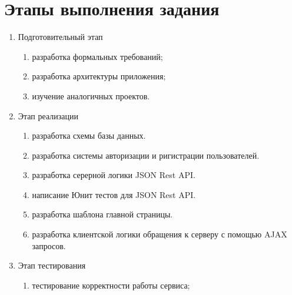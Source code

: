 \section{Этапы выполнения задания}
\label{sec:practice:task_steps}

\begin{enumerate}
  \item Подготовительный этап
  \begin{enumerate}
    \item разработка формальных требований;
    \item разработка архитектуры приложения;
    \item изучение аналогичных проектов. 
  \end{enumerate}
  
  \item Этап реализации
  \begin{enumerate}
    \item разработка схемы базы данных.
    \item разработка системы авторизации и ригистрации пользователей.
    \item разработка серерной логики JSON Rest API.
    \item написание Юнит тестов для JSON Rest API.
    \item разработка шаблона главной страницы.
    \item разработка клиентской логики обращения к серверу с помощью AJAX запросов.
  \end{enumerate}

  \item Этап тестирования
  \begin{enumerate}
    \item тестирование корректности работы сервиса;
  \end{enumerate}
\end{enumerate}

